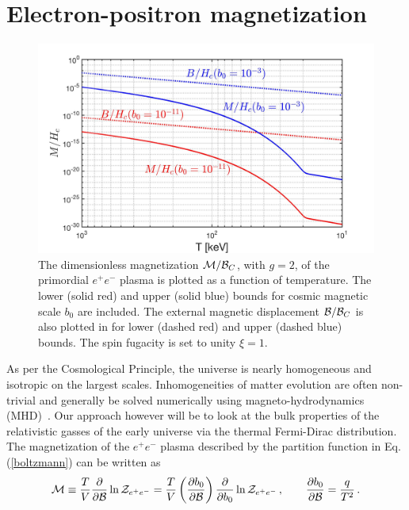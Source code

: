\documentclass[a4paper]{article}
\newcommand{\req}[1]{Eq.\,(\ref{#1})}
\begin{document}
\section{Electron-positron magnetization}
\label{sec:magnetization}
\begin{figure}[ht]
    \centering
    \includegraphics[width=\textwidth]{Magnetization_Hc.jpg}
    \caption{The dimensionless magnetization ${\cal M}/{\cal B}_{C}$, with $g=2$, of the primordial $e^{+}e^{-}$ plasma is plotted as a function of temperature. The lower (solid red) and upper (solid blue) bounds for cosmic magnetic scale $b_{0}$ are included. The external magnetic displacement ${\cal B}/{\cal B}_{C}$ is also plotted in for lower (dashed red) and upper (dashed blue) bounds. The spin fugacity is set to unity $\xi=1$.}
    \label{magplot} 
\end{figure}
\noindent As per the Cosmological Principle, the universe is nearly homogeneous and isotropic on the largest scales. Inhomogeneities of matter evolution are often non-trivial and generally be solved numerically using magneto-hydrodynamics (MHD)~\cite{melrose2008quantum,vazza2017simulations}. Our approach however will be to look at the bulk properties of the relativistic gasses of the early universe via the thermal Fermi-Dirac distribution. The magnetization of the $e^{+}e^{-}$ plasma described by the partition function in \req{boltzmann} can be written as
\begin{align}
    \label{defmagetization}
    {\cal M}\equiv\frac{T}{V}\frac{\partial}{\partial{\cal B}}\ln{{\cal Z}_{e^{+}e^{-}}} = \frac{T}{V}\left(\frac{\partial b_{0}}{\partial{\cal B}}\right)\frac{\partial}{\partial b_{0}}\ln{{\cal Z}_{e^{+}e^{-}}}\,,\qquad\frac{\partial b_{0}}{\partial{\cal B}}=\frac{q}{T^{2}}\,.
\end{align}
\end{document}
